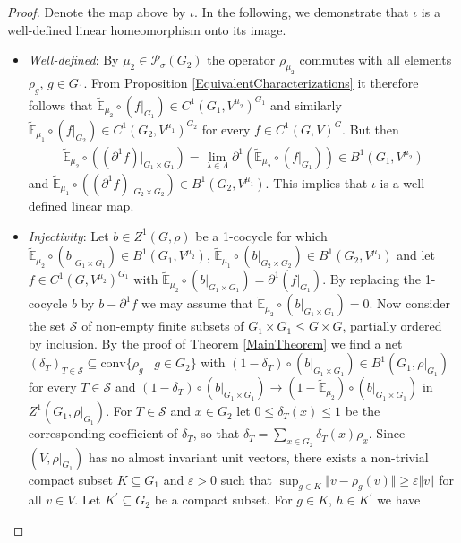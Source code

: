 \documentclass[a4paper,11pt,reqno]{amsart}
\numberwithin{equation}{section}
\theoremstyle{definition}
\theoremstyle{remark}
\theoremstyle{remark}
\begin{document}
\begin{proof} Denote the map above by $\iota$. In the following, we demonstrate that $\iota$ is a well-defined linear homeomorphism onto its image.\\

\begin{itemize}
\item \emph{Well-defined}: By $\mu_{2}\in\mathcal{P}_{\sigma}(G_{2})$ the operator $\rho_{\mu_{2}}$ commutes with all elements $\rho_{g}$, $g\in G_{1}$. From Proposition \ref{EquivalentCharacterizations} it therefore follows that $\widetilde{\mathbb{E}}_{\mu_{2}}\circ(f|_{G_{1}})\in C^{1}(G_{1},V^{\mu_{2}})^{G_{1}}$ and similarly $\widetilde{\mathbb{E}}_{\mu_{1}}\circ(f|_{G_{2}})\in C^{1}(G_{2},V^{\mu_{1}})^{G_{2}}$ for every $f\in C^{1}(G,V)^{G}$. But then 
\begin{eqnarray*}
\widetilde{\mathbb{E}}_{\mu_{2}}\circ\left((\partial^{1}f)|_{G_{1}\times G_{1}}\right)=\lim_{\lambda\in\Lambda}\partial^{1}\left(\widetilde{\mathbb{E}}_{\mu_{2}}\circ(f|_{G_{1}})\right)\in B^{1}(G_{1},V^{\mu_{2}})
\end{eqnarray*}
and $\widetilde{\mathbb{E}}_{\mu_{1}}\circ\left((\partial^{1}f)|_{G_{2}\times G_{2}}\right)\in B^{1}(G_{2},V^{\mu_{1}})$. This implies that $\iota$ is a well-defined linear map.
\item \emph{Injectivity}: Let $b\in Z^{1}(G,\rho)$ be a 1-cocycle for which $\widetilde{\mathbb{E}}_{\mu_{2}}\circ(b|_{G_{1}\times G_{1}})\in B^{1}(G_{1},V^{\mu_{2}})$, $\widetilde{\mathbb{E}}_{\mu_{1}}\circ(b|_{G_{2}\times G_{2}})\in B^{1}(G_{2},V^{\mu_{1}})$ and let $f\in C^{1}(G,V^{\mu_{2}})^{G_{1}}$ with $\widetilde{\mathbb{E}}_{\mu_{2}}\circ(b|_{G_{1}\times G_{1}})=\partial^{1}(f|_{G_{1}})$. By replacing the 1-cocycle $b$ by $b-\partial^{1}f$ we may assume that $\widetilde{\mathbb{E}}_{\mu_{2}}\circ(b|_{G_{1}\times G_{1}})=0$. Now consider the set $\mathcal{S}$ of non-empty finite subsets of $G_{1}\times G_{1}\leq G\times G$, partially ordered by inclusion. By the proof of Theorem \ref{MainTheorem} we find a net $(\delta_{T})_{T\in\mathcal{S}}\subseteq\text{conv}\{\rho_{g}\mid g\in G_{2}\}$ with $(1-\delta_{T})\circ(b|_{G_{1}\times G_{1}})\in B^{1}(G_{1},\rho|_{G_{1}})$ for every $T\in\mathcal{S}$ and $(1-\delta_{T})\circ(b|_{G_{1}\times G_{1}})\rightarrow(1-\widetilde{\mathbb{E}}_{\mu_{2}})\circ(b|_{G_{1}\times G_{1}})$ in $Z^{1}(G_{1},\rho|_{G_{1}})$. For $T\in\mathcal{S}$ and $x\in G_{2}$ let $0\leq\delta_{T}(x)\leq1$ be the corresponding coefficient of $\delta_{T}$, so that $\delta_{T}=\sum_{x\in G_{2}}\delta_{T}(x)\rho_{x}$. Since $(V,\rho|_{G_{1}})$ has no almost invariant unit vectors, there exists a non-trivial compact subset $K\subseteq G_{1}$ and $\varepsilon>0$ such that $\sup_{g\in K}\Vert v-\rho_{g}(v)\Vert\geq\varepsilon\Vert v\Vert$ for all $v\in V$. Let $K^{\prime}\subseteq G_{2}$ be a compact subset. For $g\in K$, $h\in K^{\prime}$ we have 

\end{itemize}
\end{proof}
\end{document}
